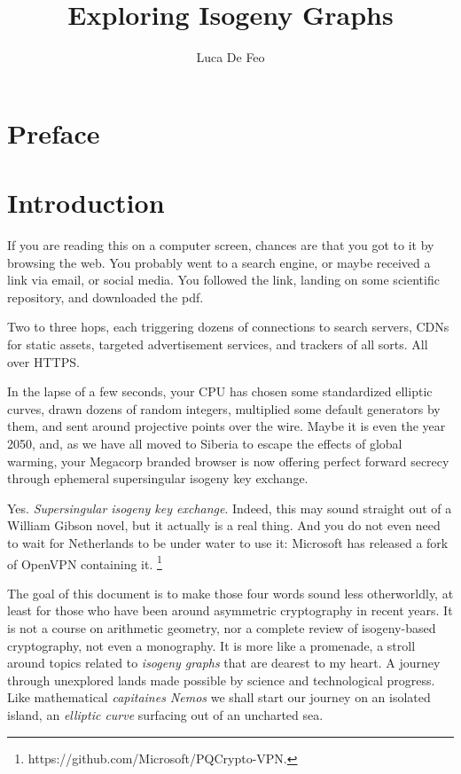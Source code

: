 \documentclass[b5layout]{hdr}
\title{Exploring Isogeny Graphs}
\author{Luca De Feo}
\begin{document}
\frontmatter



\chapter{Preface}


\tableofcontents
\clearpage


\chapter{Introduction}

If you are reading this on a computer screen, chances are that you got
to it by browsing the web. %
You probably went to a search engine, or maybe received a link via
email, or social media. %
You followed the link, landing on some scientific repository, and
downloaded the pdf. %

Two to three hops, each triggering dozens of connections to search
servers, CDNs for static assets, targeted advertisement services, and
trackers of all sorts. %
All over HTTPS. %

In the lapse of a few seconds, your CPU has chosen some standardized
elliptic curves, drawn dozens of random integers, multiplied some
default generators by them, and sent around projective points over the
wire. %
Maybe it is even the year 2050, and, as we have all moved to Siberia
to escape the effects of global warming, your Megacorp branded browser
is now offering perfect forward secrecy through ephemeral
supersingular isogeny key exchange.

Yes. \emph{Supersingular isogeny key exchange}. %
Indeed, this may sound straight out of a William Gibson novel, but it
actually is a real thing. %
And you do not even need to wait for Netherlands to be under water to
use it: Microsoft has released a fork of OpenVPN containing it.%
\footnote{https://github.com/Microsoft/PQCrypto-VPN.} %

The goal of this document is to make those four words sound less
otherworldly, at least for those who have been around asymmetric
cryptography in recent years. %
It is not a course on arithmetic geometry, nor a complete review of
isogeny-based cryptography, not even a monography. %
It is more like a promenade, a stroll around topics related to
\emph{isogeny graphs} that are dearest to my heart. %
A journey through unexplored lands made possible by science and
technological progress. %
Like mathematical \emph{capitaines Nemos} we shall start our journey
on an isolated island, an \emph{elliptic curve} surfacing out of an
uncharted sea. %
\end{document}
